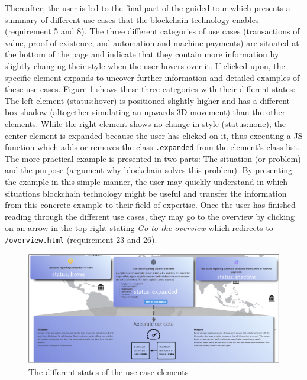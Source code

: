Thereafter, the user is led to the final part of the guided tour which presents a summary of different use cases that the blockchain technology enables (requirement 5 and 8). The three different categories of use cases (transactions of value, proof of existence, and automation and machine payments) are situated at the bottom of the page and indicate that they contain more information by slightly changing their style when the user hovers over it. If clicked upon, the specific element expands to uncover further information and detailed examples of these use cases. Figure \ref{fig:AnimUC} shows these three categories with their different states: The left element (status:hover) is positioned slightly higher and has a different box shadow (altogether simulating an upwards 3D-movement) than the other elements. While the right element shows no change in style (status:none), the center element is expanded because the user has clicked on it, thus executing a \ac{JS} function which adds or removes the class \texttt{.expanded} from the element's class list. The more practical example is presented in two parts: The situation (or problem) and the purpose (argument why blockchain solves this problem). By presenting the example in this simple manner, the user may quickly understand in which situations blockchain technology might be useful and transfer the information from this concrete example to their field of expertise. Once the user has finished reading through the different use cases, they may go to the overview by clicking on an arrow in the top right stating \textit{Go to the overview} which redirects to \texttt{/overview.html} (requirement 23 and 26). 

\begin{figure}
    \centering
    \includegraphics[width=\linewidth]{graphics/AnimationUseCases.png}
    \caption{The different states of the use case elements}
    \label{fig:AnimUC}
\end{figure}


